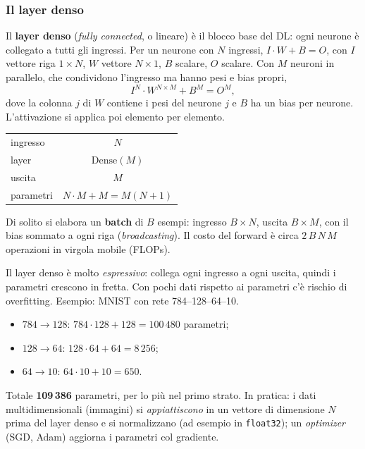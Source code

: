 \documentclass[12pt]{extarticle}
\begin{document}
\subsubsection{Il layer denso}

\noindent Il \textbf{layer denso} (\emph{fully connected}, o lineare) è il blocco base del DL: ogni neurone è collegato a tutti gli ingressi. Per un neurone con $N$ ingressi, $I\cdot W+B=O$, con $I$ vettore riga $1\times N$, $W$ vettore $N\times1$, $B$ scalare, $O$ scalare. Con $M$ neuroni in parallelo, che condividono l'ingresso ma hanno pesi e bias propri,
\[
I^{N}\cdot W^{N\times M}+B^{M}=O^{M},
\]
dove la colonna $j$ di $W$ contiene i pesi del neurone $j$ e $B$ ha un bias per neurone. L'attivazione si applica poi elemento per elemento.

\begin{center}
\small
\begin{tabular}{lc}
    \toprule
    ingresso & $N$ \\
    layer & $\mathrm{Dense}(M)$ \\
    uscita & $M$ \\
    parametri & $N\cdot M+M=M(N+1)$ \\
    \bottomrule
\end{tabular}
\end{center}

\noindent Di solito si elabora un \textbf{batch} di $B$ esempi: ingresso $B\times N$, uscita $B\times M$, con il bias sommato a ogni riga (\emph{broadcasting}). Il costo del forward è circa $2\,B\,N\,M$ operazioni in virgola mobile (FLOPs).

\noindent Il layer denso è molto \emph{espressivo}: collega ogni ingresso a ogni uscita, quindi i parametri crescono in fretta. Con pochi dati rispetto ai parametri c'è rischio di overfitting. Esempio: MNIST con rete 784--128--64--10.
\begin{itemize}
    \item $784\to128$: $784\cdot128+128=100\,480$ parametri;
    \item $128\to64$: $128\cdot64+64=8\,256$;
    \item $64\to10$: $64\cdot10+10=650$.
\end{itemize}
Totale \textbf{109\,386} parametri, per lo più nel primo strato. In pratica: i dati multidimensionali (immagini) si \emph{appiattiscono} in un vettore di dimensione $N$ prima del layer denso e si normalizzano (ad esempio in \texttt{float32}); un \emph{optimizer} (SGD, Adam) aggiorna i parametri col gradiente.
\end{document}
